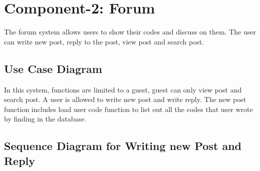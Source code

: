 \section{Component-2: Forum}
The forum system allows users to show their codes and discuss on them. The user can write new post, reply to the post, view post and search post.\newline

\subsection{Use Case Diagram}
\begin{figure}[H]
 \label{6}
 \end{figure}
In this system, functions are limited to a guest, guest can only view post and search post. A user is allowed to write new post and write reply. The new post function includes load user code function to list out all the codes that user wrote by finding in the database.

\subsection{Sequence Diagram for Writing new Post and Reply}
\begin{figure}[H]
 \label{7}
 \end{figure}

